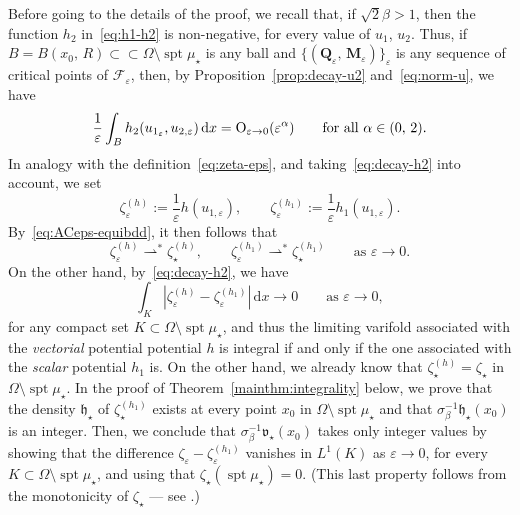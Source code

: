 \documentclass[a4paper, 11pt, twoside, leqno]{article}
\theoremstyle{definition}              %
\theoremstyle{remark}                  %
\DeclareMathOperator{\spt}{spt}                                     %
\newcommand{\abs}[1]{\left| #1 \right|}                             %
\newcommand{\csubset}{\subset\!\subset}                             %
\renewcommand{\d}{\mathrm{d}}
\newcommand{\Q}{\mathbf{Q}}
\newcommand{\M}{\mathbf{M}}
\newcommand{\F}{\mathscr{F}}
\newcommand{\eps}{\varepsilon}
\begin{document}
Before going to the details of the proof, we 
recall that, if $\sqrt{2}\beta > 1$, then the function $h_2$ 
in~\eqref{eq:h1-h2} is non-negative, for every value of $u_1$, $u_2$. 
Thus, if   
$B = B(x_0,\,R) \csubset \Omega \setminus \spt\mu_\star$ is any ball 
and $\{ (\Q_\eps,\,\M_\eps) \}_\eps$ 
is any sequence of critical points of 
$\F_\eps$, then, by Proposition~\ref{prop:decay-u2} and~\eqref{eq:norm-u}, 
we have 
\begin{equation}\label{eq:decay-h2}
    \frac{1}{\eps}\int_B h_2(u_{1_\eps}, u_{2,\eps}) \,{\d}x  
    = {\rm O}_{\eps \to 0}(\eps^{\alpha}) 
    \qquad \mbox{for all } \alpha \in (0,\,2).
\end{equation} 
In analogy with the definition~\eqref{eq:zeta-eps}, and taking~\eqref{eq:decay-h2} 
into account, we set 
\[
	\zeta_\eps^{(h)} := \frac{1}{\eps} h(u_{1,\eps}), \qquad 
	\zeta_\eps^{(h_1)} := \frac{1}{\eps} h_1(u_{1,\eps}).
\]
By~\eqref{eq:ACeps-equibdd}, it then follows that 
\[
	\zeta_\eps^{(h)} \rightharpoonup^* \zeta_\star^{(h)}, \qquad 
	\zeta_\eps^{(h_1)} \rightharpoonup^* \zeta_\star^{(h_1)} 
	\qquad \mbox{as } \eps \to 0.
\]
On the other hand, by~\eqref{eq:decay-h2}, we have  
\[
	\int_K \abs{\zeta_\eps^{(h)} - \zeta_\eps^{(h_1)}} \,{\d}x 
	\to 0 \qquad \mbox{as } \eps \to 0,
\]
for any compact set $K \subset \Omega \setminus \spt\mu_\star$, 
and thus the limiting varifold associated with the \emph{vectorial} potential 
potential $h$ is integral if and only if the one associated with 
the \emph{scalar} potential $h_1$ is. On the other hand, we already know 
that $\zeta_\star^{(h)} = \zeta_\star$ in $\Omega \setminus \spt\mu_\star$. 
In the proof of Theorem~\ref{mainthm:integrality} below, we prove 
that the density $\mathfrak{h}_\star$ of $\zeta_\star^{(h_1)}$ 
exists at every point $x_0$ in $\Omega \setminus \spt \mu_\star$ 
and that $\sigma_\beta^{-1} \mathfrak{h}_\star(x_0)$ is an integer. 
Then, we conclude that $\sigma_\beta^{-1} \mathfrak{v}_\star(x_0)$ 
takes only integer values by showing that the difference 
$\zeta_\eps - \zeta_\eps^{(h_1)}$ vanishes in $L^1(K)$ as $\eps \to 0$, 
for every $K \subset \Omega \setminus \spt \mu_\star$,   
and using that $\zeta_\star(\spt \mu_\star) = 0$. (This last property 
follows from the monotonicity of $\zeta_\star$ --- 
see \cite[Proposition~3.18(ii)]{CDS2}.)
\end{document}
